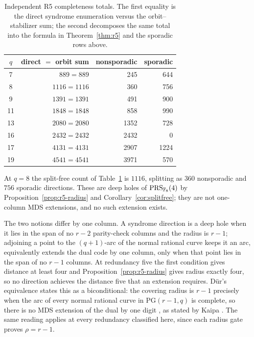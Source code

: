 \begin{table}[H]
\centering
\small
\caption{Independent R5 completeness totals.  The first equality is
the direct syndrome enumeration versus the orbit--stabilizer sum; the
second decomposes the same total into the formula in
Theorem~\ref{thm:r5} and the sporadic rows above.}
\label{tab:r5-sanity}
\begin{tabular}{crrr}
\toprule
$q$ & direct $=$ orbit sum & nonsporadic & sporadic\\
\midrule
7  & $889=889$   & 245  & 644\\
8  & $1116=1116$ & 360  & 756\\
9  & $1391=1391$ & 491  & 900\\
11 & $1848=1848$ & 858  & 990\\
13 & $2080=2080$ & 1352 & 728\\
16 & $2432=2432$ & 2432 & 0\\
17 & $4131=4131$ & 2907 & 1224\\
19 & $4541=4541$ & 3971 & 570\\
\bottomrule
\end{tabular}
\end{table}

\begin{remark}
\label{rem:q8-no-extension}
At \(q=8\) the split-free count of Table~\ref{tab:r5-sanity} is
\(1116\), splitting as \(360\) nonsporadic and \(756\) sporadic
directions.  These are deep holes of \(\operatorname{PRS}_{\mathbb F_8}(4)\) by
Proposition~\ref{prop:r5-radius} and
Corollary~\ref{cor:splitfree}; they are not one-column MDS extensions,
and no such extension exists.

The two notions differ by one column.  A syndrome direction is a deep
hole when it lies in the span of no \(r-2\) parity-check columns and
the radius is \(r-1\); adjoining a point to the \((q+1)\)-arc of the
normal rational curve keeps it an arc, equivalently extends the dual
code by one column, only when that point lies in the span of no
\(r-1\) columns.  At redundancy five the first condition gives distance
at least four and Proposition~\ref{prop:r5-radius} gives radius exactly
four, so no direction achieves the distance five that an extension
requires.  D\"ur's equivalence states this as a biconditional: the
covering radius is \(r-1\) precisely when the arc of every normal
rational curve in \(\mathrm{PG}(r-1,q)\) is complete, so there is no MDS
extension of the dual by one digit
\cite{Dur1994}, as stated by Kaipa \cite[Sec.~IV]{Kaipa2017}.  The same
reading applies at every redundancy classified here, since each radius
gate proves \(\rho=r-1\).

\end{remark}
